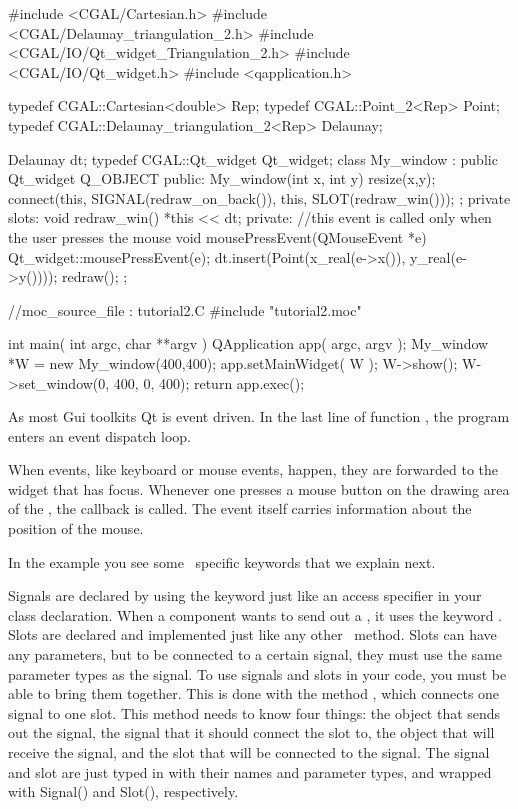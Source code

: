 \ccExample
\begin{ccExampleCode}
#include <CGAL/Cartesian.h>
#include <CGAL/Delaunay_triangulation_2.h>
#include <CGAL/IO/Qt_widget_Triangulation_2.h>
#include <CGAL/IO/Qt_widget.h>
#include <qapplication.h>

typedef CGAL::Cartesian<double>		    Rep;
typedef CGAL::Point_2<Rep>		    Point;
typedef CGAL::Delaunay_triangulation_2<Rep> Delaunay;

Delaunay dt;
typedef CGAL::Qt_widget Qt_widget;
class My_window : public Qt_widget {
  Q_OBJECT
public:
  My_window(int x, int y){
    resize(x,y);
    connect(this, SIGNAL(redraw_on_back()),
	   this, SLOT(redraw_win()));
  };
private slots:  
  void redraw_win()
  {
    *this << dt;
  }
private:
  //this event is called only when the user presses the mouse
  void mousePressEvent(QMouseEvent *e)
  {
    Qt_widget::mousePressEvent(e);
    dt.insert(Point(x_real(e->x()), y_real(e->y())));
    redraw();
  }
};

//moc_source_file : tutorial2.C
#include "tutorial2.moc"

int main( int argc, char **argv )
{
    QApplication app( argc, argv );
    My_window *W = new My_window(400,400);
    app.setMainWidget( W );
    W->show();
    W->set_window(0, 400, 0, 400);
    return app.exec();
}

\end{ccExampleCode}

As most {\sc Gui} toolkits Qt is event driven.  In the last line
of function , the program enters an event dispatch loop.

When events, like keyboard or mouse events, happen, they
are forwarded to the widget that has focus.  Whenever one
presses a mouse button on the drawing area of the ,
the callback  is called.
The event itself carries information about the position of the mouse.

In the example you see some \qt\ specific keywords that we explain
next.

Signals are declared by using the keyword  just like an
access specifier in your class declaration. When a component wants to
send out a , it uses the keyword . Slots are
declared and implemented just like any other \CC\ method. Slots can
have any parameters, but to be connected to a certain signal, they
must use the same parameter types as the signal. To use signals and
slots in your code, you must be able to bring them together. This is
done with the method , which connects one
signal to one slot. This method needs to know four things: the object
that sends out the signal, the signal that it should connect the slot
to, the object that will receive the signal, and the slot that will be 
connected to the signal. The signal and slot are just typed in with
their names and parameter types, and wrapped with {\sc Signal()} and
{\sc Slot()}, respectively.

